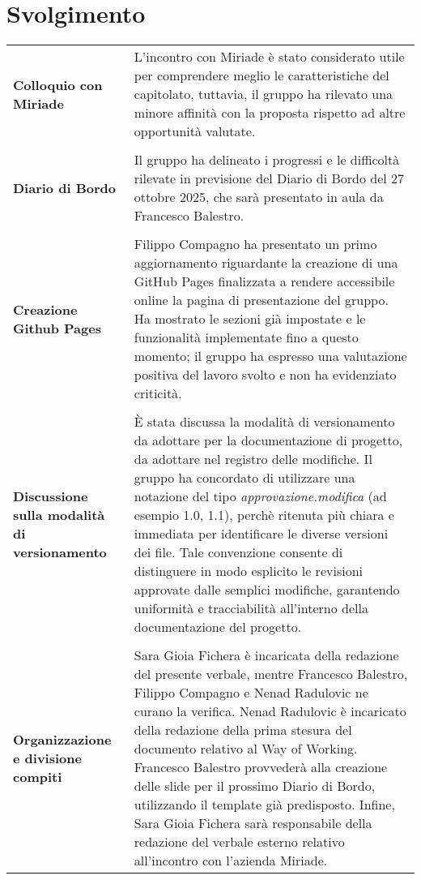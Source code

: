\documentclass[a4paper,12pt]{article}
\begin{document}
\section{Svolgimento}
\begin{longtable}{P{5cm}|P{10cm}}
\textbf{Colloquio con Miriade} & L’incontro con Miriade è stato considerato utile per comprendere meglio le caratteristiche del capitolato, tuttavia, il gruppo ha rilevato una minore affinità con la proposta rispetto ad altre opportunità valutate.\\
\\
\textbf{Diario di Bordo} & Il gruppo ha delineato i progressi e le difficoltà rilevate in previsione del Diario di Bordo del 27 ottobre 2025, che sarà presentato in aula da Francesco Balestro.\\
\\
\textbf{Creazione Github Pages} & Filippo Compagno ha presentato un primo aggiornamento riguardante la creazione di una GitHub Pages finalizzata a rendere accessibile online la pagina di presentazione del gruppo. Ha mostrato le sezioni già impostate e le funzionalità implementate fino a questo momento; il gruppo ha espresso una valutazione positiva del lavoro svolto e non ha evidenziato criticità. \\
\\
\textbf{Discussione sulla modalità di versionamento} & È stata discussa la modalità di versionamento da adottare per la documentazione di progetto, da adottare nel registro delle modifiche. Il gruppo ha concordato di utilizzare una notazione del tipo \textit{approvazione.modifica} (ad esempio 1.0, 1.1), perchè ritenuta più chiara e immediata per identificare le diverse versioni dei file. Tale convenzione consente di distinguere in modo esplicito le revisioni approvate dalle semplici modifiche, garantendo uniformità e tracciabilità all’interno della documentazione del progetto.
\\
\\
\textbf{Organizzazione e divisione compiti} & Sara Gioia Fichera è incaricata della redazione del presente verbale, mentre Francesco Balestro, Filippo Compagno e Nenad Radulovic ne curano la verifica.
Nenad Radulovic è incaricato della redazione della prima stesura del documento relativo al Way of Working.
Francesco Balestro provvederà alla creazione delle slide per il prossimo Diario di Bordo, utilizzando il template già predisposto.
Infine, Sara Gioia Fichera sarà responsabile della redazione del verbale esterno relativo all’incontro con l’azienda Miriade.
\\
\end{longtable}
\end{document}
